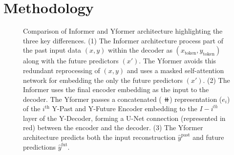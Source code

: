 \section{Methodology}

\begin{figure}[!ht]
    \hspace*{-0.7cm} 
\caption{Comparison of Informer and Yformer architecture highlighting the three key differences. (1) The Informer architecture process part of the past input data $(x, y)$ within the decoder as $(x_{\text{token}}, y_{\text{token}})$ along with the future predictors $(x')$. The Yformer avoids this redundant reprocessing of $(x,y)$ and uses a masked self-attention network for embedding the only the future predictors $(x')$. (2) The Informer uses the final encoder embedding as the input to the decoder. The Yformer passes a concatenated ( $\doubleplus$) representation ($e_i$) of the $i^{\text{th}}$ Y-Past and Y-Future Encoder embedding to the ${I-i}^{th}$ layer of the Y-Decoder, forming a U-Net connection (represented in red) between the encoder and the decoder. (3) The Yformer architecture predicts both the input reconstruction $\hat{y}^{\text{past}}$ and future predictions $\hat{y}^{\text{fut}}$.}
\label{fig:architecture}
\end{figure}


